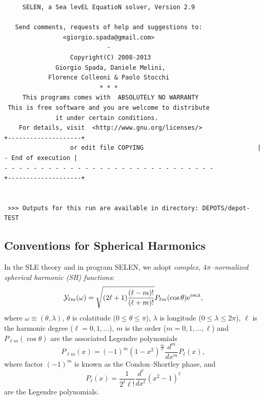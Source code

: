 \documentclass[11pt,fleqn,a4paper,titlepage]{article}
\newcommand\selens{\textsf{SELEN}}
\begin{document}
{{\begin{verbatim}
     SELEN, a Sea levEL EquatioN solver, Version 2.9

   Send comments, requests of help and suggestions to:
                <giorgio.spada@gmail.com>
                            -
                  Copyright(C) 2008-2013
              Giorgio Spada, Daniele Melini,
            Florence Colleoni & Paolo Stocchi
                          * * *
     This programs comes with  ABSOLUTELY NO WARRANTY
 This is free software and you are welcome to distribute
              it under certain conditions.
    For details, visit  <http://www.gnu.org/licenses/>               +--------------------+
                  or edit file COPYING                               | - End of execution | 
- - - - - - - - - - - - - - - - - - - - - - - - - - - - -            +--------------------+


 >>> Outputs for this run are available in directory: DEPOTS/depot-TEST
\end{verbatim} }} 
\clearpage

\subsection{Conventions for Spherical Harmonics}\label{sec:shs}
In the SLE theory and in program \selens, we 
adopt \textit{complex, $4\pi$--normalized spherical harmonic (SH) functions}: 
\begin{equation}\label{eq:ylm}
{\cal Y}_{\ell m}(\omega) = 
\sqrt{(2\ell +1)\frac{(\ell -m)!}{(\ell +m)!}}
P_{\ell m} (\cos\theta) \textrm{e}^{im\lambda}, 
\end{equation}
where $\omega\equiv (\theta,\lambda)$, $\theta$ is colatitude ($0\le \theta\le \pi$), $\lambda$ is longitude ($0\le \lambda\le 2\pi$), $\ell$ is the harmonic degree ($\ell =0, 1, \ldots$), $m$ is the order 
($m=0, 1, \ldots, \ell$) and $P_{\ell m}(\cos\theta)$ are the associated Legendre polynomials
\begin{equation}\label{eq:plm}
P_{\ell m} (x) =  (-1)^m (1-x^2)^{\frac{m}{2}} \frac{d^m}{dx^m} P_\ell (x), 
\end{equation}
where factor $(-1)^{m}$ is known as the 
Condon--Shortley phase, and 
\begin{equation}
P_\ell(x) = \frac{1}{2^\ell \ell !} \frac{d^\ell}{dx^\ell}(x^2-1)^\ell
\end{equation} 
are the Legendre polynomials. 
\end{document}

